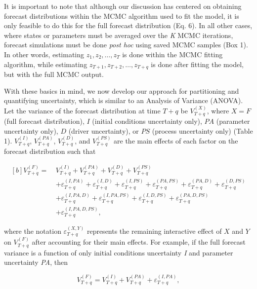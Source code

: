 \documentclass[12pt,]{article}
\begin{document}
It is important to note that although our discussion has centered on
obtaining forecast distributions within the MCMC algorithm used to fit
the model, it is only feasible to do this for the full forecast
distribution (Eq. 6). In all other cases, where states or parameters
must be averaged over the \emph{K} MCMC iterations, forecast simulations
must be done \emph{post hoc} using saved MCMC samples (Box 1). In other
words, estimating \(z_1,z_2,\dots,z_T\) is done within the MCMC fitting
algorithm, while estimating \(z_{T+1},z_{T+2},\dots,z_{T+q}\) is done
after fitting the model, but with the full MCMC output.

With these basics in mind, we now develop our approach for partitioning
and quantifying uncertainty, which is similar to an Analysis of Variance
(ANOVA). Let the variance of the forecast distribution at time \(T+q\)
be \(V^{(X)}_{T+q}\), where \(X=F\) (full forecast distribution), \(I\)
(initial conditions uncertainty only), \(PA\) (parameter uncertainty
only), \(D\) (driver uncertainty), or \(PS\) (process uncertainty only)
(Table 1). \(V_{T+q}^{(I)}\), \(V_{T+q}^{(PA)}\), \(V_{T+q}^{(D)}\), and
\(V_{T+q}^{(PS)}\) are the main effects of each factor on the forecast
distribution such that

\begin{equation}
\begin{aligned}[b]
V_{T+q}^{(F)} = \ &V_{T+q}^{(I)} + V_{T+q}^{(PA)} + V_{T+q}^{(D)} + V_{T+q}^{(PS)} \\
&+ \varepsilon_{T+q}^{(I,PA)} + \varepsilon_{T+q}^{(I,D)} + \varepsilon_{T+q}^{(I,PS)} + \varepsilon_{T+q}^{(PA,PS)} + \varepsilon_{T+q}^{(PA,D)} + \varepsilon_{T+q}^{(D,PS)} \\
&+ \varepsilon_{T+q}^{(I,PA,D)} + \varepsilon_{T+q}^{(I,PA,PS)} + \varepsilon_{T+q}^{(I,D,PS)} + \varepsilon_{T+q}^{(PA,D,PS)} \\
&+ \varepsilon_{T+q}^{(I,PA,D,PS)},
\end{aligned}
\end{equation}

\noindent{}where the notation \(\varepsilon_{T+q}^{(X,Y)}\) represents
the remaining interactive effect of \(X\) and \(Y\) on \(V_{T+q}^{(F)}\)
after accounting for their main effects. For example, if the full
forecast variance is a function of only initial conditions uncertainty
\emph{I} and parameter uncertainty \emph{PA}, then

\begin{equation}
V^{(F)}_{T+q} = V^{(I)}_{T+q} + V^{(PA)}_{T+q} + \varepsilon_{T+q}^{(I,PA)},
\end{equation}
\end{document}
